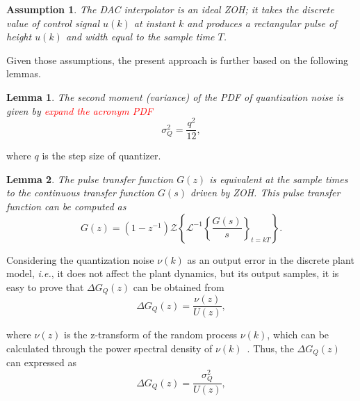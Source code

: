 \documentclass{sig-alternate-05-2015}
\newtheorem{myassumption}{Assumption}
\newtheorem{mylemma}{Lemma}
\begin{document}
\begin{myassumption}
%
The DAC interpolator is an ideal ZOH; it takes the discrete value of control
signal $u(k)$ at instant $k$ and produces a rectangular pulse of height
$u(k)$ and width equal to the sample time $T$.
%
\end{myassumption}

Given those assumptions, the present approach is further based on the following lemmas.
%
\begin{mylemma}
%
\cite{widrow1956} The second moment (variance) of the PDF of quantization
noise is given by \textcolor{red}{expand the acronym PDF}
%
\begin{equation}
\label{eq:variancelemma}
\sigma_{Q}^{2}=\frac{q^{2}}{12},
\end{equation}
\end{mylemma}

\noindent where $q$ is the step size of quantizer.

\begin{mylemma} \cite{astrom1997computer}
%
The pulse transfer function $G(z)$ is equivalent at the sample times to the
continuous transfer function $G(s)$ driven by ZOH.  This pulse transfer
function can be computed as
%
\begin{equation}
\label{eq:pulsetf}
G(z)=(1-z^{-1})\mathcal{Z}\left\lbrace{\mathcal{L}^{-1}\left\lbrace{\frac{G(s)}{s}}\right\rbrace_{t=kT}}\right\rbrace.
\end{equation}
\end{mylemma}

Considering the quantization noise $\nu(k)$ as an output error in the
discrete plant model, {\it i.e.}, it does not affect the plant dynamics, but
its output samples, it is easy to prove that $\Delta{G_{Q}(z)}$ can be
obtained from
%
\begin{equation}
\label{eq:quantization_tf}
\Delta{G_{Q}(z)}=\frac{\nu(z)}{U(z)},
\end{equation}

\noindent where $\nu(z)$ is the z-transform of the random process $\nu(k)$,
which can be calculated through the power spectral density of
$\nu(k)$~\cite{poularikas2000transforms}.  Thus, the $\Delta{G_{Q}(z)}$ can
expressed as
%
\begin{equation}
\label{eq:deltag_var}
\Delta{G_{Q}(z)}=\frac{\sigma_{Q}^{2}}{U(z)},
\end{equation}
\end{document}
